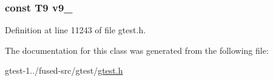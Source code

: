 \hypertarget{classtesting_1_1internal_1_1ValueArray20_a6356e16cf54a9dfac8525f20242af31e}{
\subsubsection[{v9\-\_\-}]{\setlength{\rightskip}{0pt plus 5cm}const \-T9 {\bf v9\-\_\-}}}\label{da/d93/classtesting_1_1internal_1_1ValueArray20_a6356e16cf54a9dfac8525f20242af31e}


\-Definition at line 11243 of file gtest.\-h.



\-The documentation for this class was generated from the following file\-:\begin{DoxyCompactItemize}
\item 
gtest-\/1../fused-\/src/gtest/\hyperlink{fused-src_2gtest_2gtest_8h}{gtest.\-h}\end{DoxyCompactItemize}
